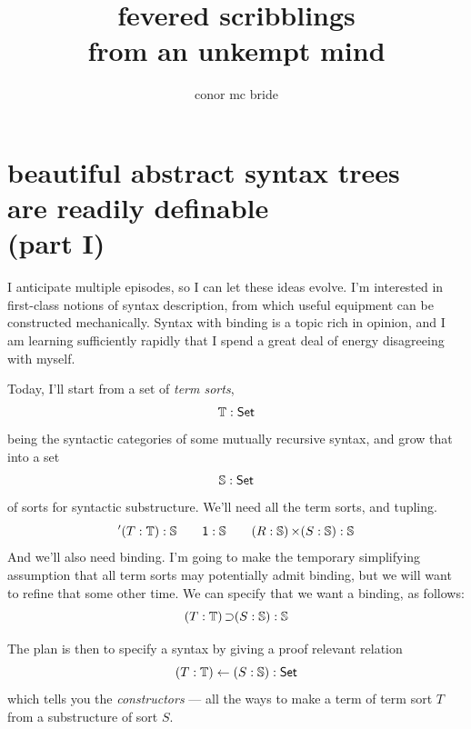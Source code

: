 \documentclass{book}
\newcommand{\D}[1]{\blue{\ensuremath{\mathsf{#1}}}}
\newcommand{\C}[1]{\red{\ensuremath{\mathsf{#1}}}}
\newcommand{\N}[1]{\black{\ensuremath{#1}}}
\newcommand{\SET}{\D{\mathsf{Set}}}
\begin{document}
\title{fevered scribblings\\ from an unkempt mind}
\author{conor mc bride}
\maketitle

\tableofcontents
\newpage

\chapter{beautiful abstract syntax trees\\are readily definable\\(part I)}

\newcommand{\TmS}{\D{\mathbb{T}}}
\newcommand{\Sort}{\D{\mathbb{S}}}
\newcommand{\sone}{\C{1}}
\newcommand{\stimes}{\mathop{\red{\times}}}
\newcommand{\stm}[1]{\red{'}#1}
\newcommand{\shook}{\mathop{\red{\supset}}}
\newcommand{\cfrom}{\mathrel{\blue{\leftarrow}}}
\newcommand{\vni}{\mathrel{\green{\ni}}}
\newcommand{\Bwd}[1]{\D{Bwd}\:#1}
\newcommand{\tm}{\mathrel{\blue{\vdash}}}
\newcommand{\va}[1]{\C{\char35}#1}
\newcommand{\cn}[2]{#1\red{-\!\langle\N{#2}\rangle}}

I anticipate multiple episodes, so I can let these ideas evolve. I'm interested in first-class notions of syntax description, from which useful equipment can be constructed mechanically. Syntax with binding is a topic rich in opinion, and I am learning sufficiently rapidly that I spend a great deal of energy disagreeing with myself.

Today, I'll start from a set of \emph{term sorts}, 
\[
\TmS : \SET
\]
being the syntactic categories of some mutually recursive syntax, and grow that into a set
\[\Sort:\SET\]
of sorts for syntactic substructure. We'll need all the term sorts, and tupling.
\[
\stm{(T : \TmS):\Sort \qquad \sone : \Sort \qquad (R : \Sort)\stimes(S : \Sort) : \Sort }
\]
And we'll also need binding. I'm going to make the temporary simplifying assumption
that all term sorts may potentially admit binding, but we will want to refine that some other time.
We can specify that we want a binding, as follows:
\[
(T:\TmS)\shook (S:\Sort) : \Sort
\]

The plan is then to specify a syntax by giving a proof relevant relation
\[
(T:\TmS)\cfrom (S:\Sort) : \SET
\]
which tells you the \emph{constructors} --- all the ways to make a term of term sort $T$ from a substructure of sort $S$.
\end{document}
